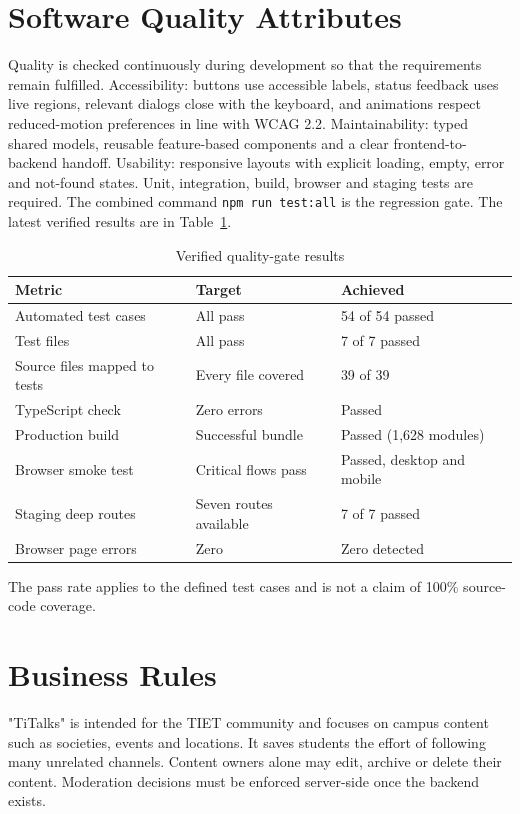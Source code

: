 \documentclass{scrreprt}
\begin{document}
\section{Software Quality Attributes}
Quality is checked continuously during development so that the requirements remain fulfilled. Accessibility: buttons use accessible labels, status feedback uses live regions, relevant dialogs close with the keyboard, and animations respect reduced-motion preferences in line with WCAG 2.2. Maintainability: typed shared models, reusable feature-based components and a clear frontend-to-backend handoff. Usability: responsive layouts with explicit loading, empty, error and not-found states.
\newline
Unit, integration, build, browser and staging tests are required. The combined command \texttt{npm run test:all} is the regression gate. The latest verified results are in Table~\ref{tab:quality}.
\begin{table}[h]
\centering
\begin{tabular}{|p{}|p{}|p{}|}
  \hline
  \textbf{Metric} & \textbf{Target} & \textbf{Achieved} \\
  \hline
  Automated test cases & All pass & 54 of 54 passed \\
  \hline
  Test files & All pass & 7 of 7 passed \\
  \hline
  Source files mapped to tests & Every file covered & 39 of 39 \\
  \hline
  TypeScript check & Zero errors & Passed \\
  \hline
  Production build & Successful bundle & Passed (1,628 modules) \\
  \hline
  Browser smoke test & Critical flows pass & Passed, desktop and mobile \\
  \hline
  Staging deep routes & Seven routes available & 7 of 7 passed \\
  \hline
  Browser page errors & Zero & Zero detected \\
  \hline
\end{tabular}
\caption{Verified quality-gate results}
\label{tab:quality}
\end{table}
The pass rate applies to the defined test cases and is not a claim of 100\% source-code coverage.

\section{Business Rules}
"TiTalks" is intended for the TIET community and focuses on campus content such as societies, events and locations. It saves students the effort of following many unrelated channels. Content owners alone may edit, archive or delete their content. Moderation decisions must be enforced server-side once the backend exists.
\end{document}
